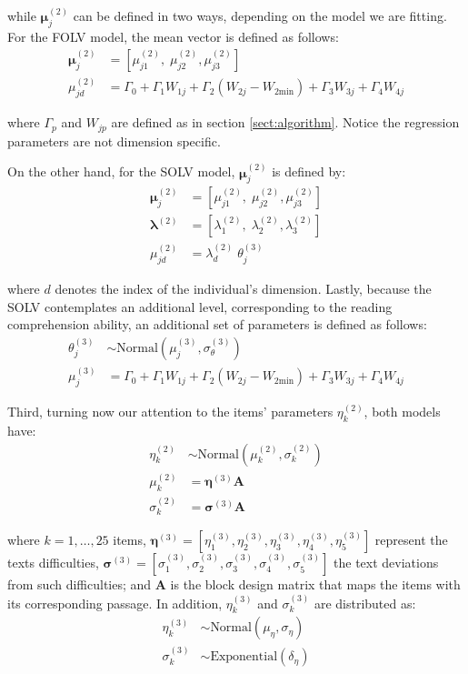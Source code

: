 while $\boldsymbol{\mu}^{(2)}_{j}$ can be defined in two ways, depending on the model we are fitting. For the FOLV model, the mean vector is defined as follows:
%
\begin{align}
	\boldsymbol{\mu}^{(2)}_{j} &= \left[ \mu^{(2)}_{j1}, \; \mu^{(2)}_{j2}, \mu^{(2)}_{j3} \right] \\
	\mu^{(2)}_{jd} &= \Gamma_{0} + \Gamma_{1} W_{1j} + \Gamma_{2} (W_{2j} - W_{2\text{min}}) + \Gamma_{3} W_{3j} + \Gamma_{4} W_{4j}
\end{align}

where $\Gamma_{p}$ and $W_{jp}$ are defined as in section \ref{sect:algorithm}. Notice the regression parameters are not dimension specific. 

On the other hand, for the SOLV model, $\boldsymbol{\mu}^{(2)}_{j}$ is defined by:
%
\begin{align}
	\boldsymbol{\mu}^{(2)}_{j} &= \left[ \mu^{(2)}_{j1}, \; \mu^{(2)}_{j2}, \mu^{(2)}_{j3} \right] \\
	\pmb{\lambda}^{(2)} &= \left[ \lambda^{(2)}_{1}, \; \lambda^{(2)}_{2}, \lambda^{(2)}_{3} \right] \\
	\mu^{(2)}_{jd} &= \lambda^{(2)}_{d} \; \theta^{(3)}_{j} 
\end{align}

where $d$ denotes the index of the individual's dimension. Lastly, because the SOLV contemplates an additional level, corresponding to the reading comprehension ability, an additional set of parameters is defined as follows:
%
\begin{align}
	\theta^{(3)}_{j} &\sim \text{Normal} \left( \mu^{(3)}_{j}, \sigma^{(3)}_{\theta} \right) \\
	\mu^{(3)}_{j} &=  \Gamma_{0} + \Gamma_{1} W_{1j} + \Gamma_{2} (W_{2j} - W_{2\text{min}}) + \Gamma_{3} W_{3j} + \Gamma_{4} W_{4j}
\end{align}

Third, turning now our attention to the items' parameters $\eta^{(2)}_{k}$, both models have:
%
\begin{align}
	\eta^{(2)}_{k} &\sim \text{Normal} \left( \mu^{(2)}_{k}, \sigma^{(2)}_{k} \right) \\
	\mu^{(2)}_{k} &= \pmb{\eta}^{(3)} \mathbf{A} \\
	\sigma^{(2)}_{k} &= \pmb{\sigma}^{(3)} \mathbf{A}
\end{align}

where $k=1, \dots, 25$ items, $\pmb{\eta}^{(3)} = [ \eta^{(3)}_{1}, \eta^{(3)}_{2}, \eta^{(3)}_{3}, \eta^{(3)}_{4}, \eta^{(3)}_{5} ]$ represent the texts difficulties, $\pmb{\sigma}^{(3)} = [ \sigma^{(3)}_{1}, \sigma^{(3)}_{2}, \sigma^{(3)}_{3}, \sigma^{(3)}_{4}, \sigma^{(3)}_{5} ]$ the text deviations from such difficulties; and $\mathbf{A}$ is the block design matrix that maps the items with its corresponding passage. In addition, $\eta^{(3)}_{k}$ and $\sigma^{(3)}_{k}$ are distributed as:
%
\begin{align}
	\eta^{(3)}_{k} &\sim \text{Normal} \left( \mu_{\eta}, \sigma_{\eta} \right) \\
	\sigma^{(3)}_{k} &\sim \text{Exponential} \left( \delta_{\eta} \right)
\end{align}

